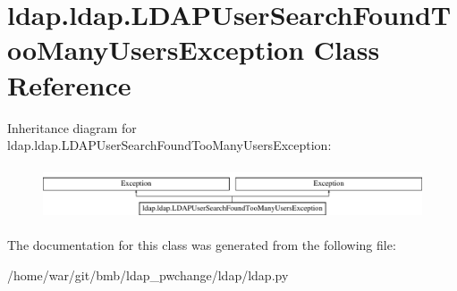 \hypertarget{classldap_1_1ldap_1_1LDAPUserSearchFoundTooManyUsersException}{\section{ldap.\-ldap.\-L\-D\-A\-P\-User\-Search\-Found\-Too\-Many\-Users\-Exception Class Reference}
\label{classldap_1_1ldap_1_1LDAPUserSearchFoundTooManyUsersException}
}
Inheritance diagram for ldap.\-ldap.\-L\-D\-A\-P\-User\-Search\-Found\-Too\-Many\-Users\-Exception\-:\begin{figure}[H]
\begin{center}
\leavevmode
\includegraphics[height=1.590909cm]{classldap_1_1ldap_1_1LDAPUserSearchFoundTooManyUsersException}
\end{center}
\end{figure}


The documentation for this class was generated from the following file\-:\begin{DoxyCompactItemize}
\item 
/home/war/git/bmb/ldap\-\_\-pwchange/ldap/ldap.\-py\end{DoxyCompactItemize}
